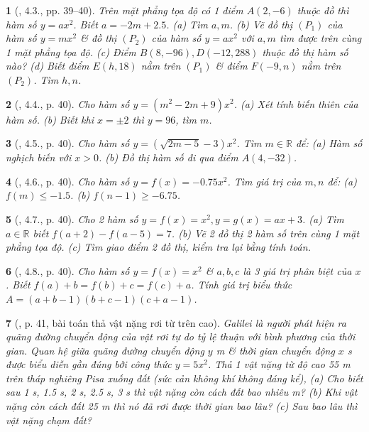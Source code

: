 \documentclass{article}
\newtheorem{baitoan}{}
\begin{document}
\begin{baitoan}[\cite{Binh_boi_duong_Toan_9_tap_2}, 4.3., pp. 39--40]
	Trên mặt phẳng tọa độ có 1 điểm $A(2,-6)$ thuộc đồ thì hàm số $y = ax^2$. Biết $a = -2m + 2.5$. (a) Tìm $a,m$. (b) Vẽ đồ thị $(P_1)$ của hàm số $y = mx^2$ \& đồ thị $(P_2)$ của hàm số $y = ax^2$ với $a,m$ tìm được trên cùng 1 mặt phẳng tọa độ. (c) Điểm $B(8,-96),D(-12,288)$ thuộc đồ thị hàm số nào? (d) Biết điểm $E(h,18)$ nằm trên $(P_1)$ \& điểm $F(-9,n)$ nằm trên $(P_2)$. Tìm $h,n$.
\end{baitoan}

\begin{baitoan}[\cite{Binh_boi_duong_Toan_9_tap_2}, 4.4., p. 40]
	Cho hàm số $y = (m^2 - 2m + 9)x^2$. (a) Xét tính biến thiên của hàm số. (b) Biết khi $x = \pm2$ thì $y = 96$, tìm $m$.
\end{baitoan}

\begin{baitoan}[\cite{Binh_boi_duong_Toan_9_tap_2}, 4.5., p. 40]
	Cho hàm số $y = (\sqrt{2m - 5} - 3)x^2$. Tìm $m\in\mathbb{R}$ để: (a) Hàm số nghịch biến với $x > 0$. (b) Đồ thị hàm số đi qua điểm $A(4,-32)$.
\end{baitoan}

\begin{baitoan}[\cite{Binh_boi_duong_Toan_9_tap_2}, 4.6., p. 40]
	Cho hàm số $y = f(x) = -0.75x^2$. Tìm giá trị của $m,n$ để: (a) $f(m)\le-1.5$. (b) $f(n - 1)\ge-6.75$.
\end{baitoan}

\begin{baitoan}[\cite{Binh_boi_duong_Toan_9_tap_2}, 4.7., p. 40]
	Cho 2 hàm số $y = f(x) = x^2,y = g(x) = ax + 3$. (a) Tìm $a\in\mathbb{R}$ biết $f(a + 2) - f(a - 5) = 7$. (b) Vẽ 2 đồ thị 2 hàm số trên cùng 1 mặt phẳng tọa độ. (c) Tìm giao điểm 2 đồ thị, kiểm tra lại bằng tính toán.
\end{baitoan}

\begin{baitoan}[\cite{Binh_boi_duong_Toan_9_tap_2}, 4.8., p. 40]
	Cho hàm số $y = f(x) = x^2$ \& $a,b,c$ là 3 giá trị phân biệt của $x$. Biết $f(a) + b = f(b) + c = f(c) + a$. Tính giá trị biểu thức $A = (a + b - 1)(b + c - 1)(c + a - 1)$.
\end{baitoan}

\begin{baitoan}[\cite{Binh_boi_duong_Toan_9_tap_2}, p. 41, bài toán thả vật nặng rơi từ trên cao]
	Galilei là người phát hiện ra quãng đường chuyển động của vật rơi tự do tỷ lệ thuận với bình phương của thời gian. Quan hệ giữa quãng đường chuyển động $y$ {\rm m} \& thời gian chuyển động $x$ {\rm s} được biểu diễn gần đúng bởi công thức $y = 5x^2$. Thả 1 vật nặng từ độ cao {\rm55 m} trên tháp nghiêng Pisa xuống đất (sức cản không khí không đáng kể), (a) Cho biết sau {\rm1 s, 1.5 s, 2 s, 2.5 s, 3 s} thì vật nặng còn cách đất bao nhiêu {\rm m}? (b) Khi vật nặng còn cách đất {\rm25 m} thì nó đã rơi được thời gian bao lâu? (c) Sau bao lâu thì vật nặng chạm đất?
\end{baitoan}
\end{document}

